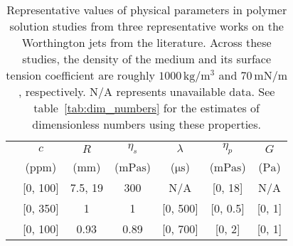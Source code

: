 \documentclass[]{article}
\begin{document}
\begin{enumerate}
\begin{enumerate}
\begin{itemize}
        \begin{table}
            \begin{center}
                \begin{tabular}{lcccccc}
                    \hline
                    &$c$ & $R$ & $\eta_s$  & $\lambda$ & $\eta_p$ & $G$ \\
                    & (ppm) & ($\si{\milli\meter}$) & ($\si{\milli\pascal\second}$) & ($\si{\micro\second}$) & ($\si{\milli\pascal\second}$) & ($\si{\pascal}$) \\[3pt]
                    \citet{cheny1996extravagant} & [0, 100]  & 7.5, 19  & 300   & N/A & [0, 18] & N/A \\
                    \citet{rodriguez2023bubble} & [0, 350] & 1 & 1  & [0, 500] & [0, 0.5] & [0, 1] \\
                    \citet{cabalganteeffect} & [0, 100] & 0.93 & 0.89 & [0, 700] & [0, 2] &[0, 1] \\
                    \hline
                \end{tabular}
                \caption{Representative values of physical parameters in polymer solution studies from three representative works on the Worthington jets from the literature. Across these studies, the density of the medium and its surface tension coefficient are roughly $1000\,\si{\kilogram}/\si{\cubic\meter}$ and $70\,\si{\milli\newton}/\si{\meter}$, respectively. N/A represents unavailable data. See table~\ref{tab:dim_numbers} for the estimates of dimensionless numbers using these properties.}
                \label{tab:ExpOnlydim_numbers}
            \end{center}
        \end{table}
        

\end{itemize}
\end{enumerate}
\end{enumerate}
\end{document}
